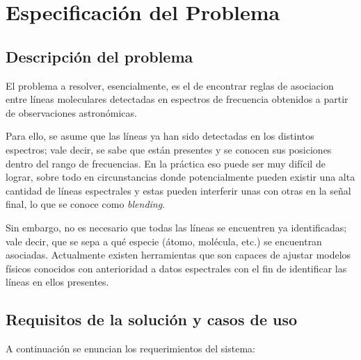 \chapter{Especificación del Problema}


\section{Descripción del problema}

El problema a resolver, esencialmente, es el de encontrar reglas de asociacion entre líneas moleculares detectadas en espectros de frecuencia obtenidos a partir de observaciones astronómicas.

Para ello, se asume que las líneas ya han sido detectadas en los distintos espectros; vale decir, se sabe que están presentes y se conocen sus posiciones dentro del rango de frecuencias. En la práctica eso puede ser muy difícil de lograr, sobre todo en circunstancias donde potencialmente pueden existir una alta cantidad de líneas espectrales y estas pueden interferir unas con otras en la señal final, lo que se conoce como \textit{blending}. 

Sin embargo, no es necesario que todas las líneas se encuentren ya identificadas; vale decir, que se sepa a qué especie (átomo, molécula, etc.) se encuentran asociadas. Actualmente existen herramientas que son capaces de ajustar modelos físicos conocidos con anterioridad a datos espectrales con el fin de identificar las líneas en ellos presentes.

\section{Requisitos de la solución y casos de uso}

A continuación se enuncian los requerimientos del sistema:

